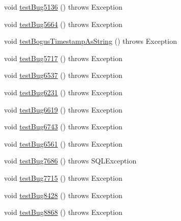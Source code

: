 \begin{DoxyCompactItemize}
\item 
void \mbox{\hyperlink{classtestsuite_1_1regression_1_1_result_set_regression_test_a9f4b082f0411dbf1f533998671d080cd}{test\+Bug5136}} ()  throws Exception 
\item 
void \mbox{\hyperlink{classtestsuite_1_1regression_1_1_result_set_regression_test_aaf08edff0fccda829794321f5eed7ca3}{test\+Bug5664}} ()  throws Exception 
\item 
void \mbox{\hyperlink{classtestsuite_1_1regression_1_1_result_set_regression_test_ad40a060d01d13a1c3718497ece0ea53b}{test\+Bogus\+Timestamp\+As\+String}} ()  throws Exception 
\item 
void \mbox{\hyperlink{classtestsuite_1_1regression_1_1_result_set_regression_test_a08e8e83e8ac874e16cd5aa89e43f6862}{test\+Bug5717}} ()  throws Exception 
\item 
void \mbox{\hyperlink{classtestsuite_1_1regression_1_1_result_set_regression_test_abe87e577ef06bd6b70aa3f685177c272}{test\+Bug6537}} ()  throws Exception 
\item 
void \mbox{\hyperlink{classtestsuite_1_1regression_1_1_result_set_regression_test_aeb09775b50784baa772c121c33812f23}{test\+Bug6231}} ()  throws Exception 
\item 
void \mbox{\hyperlink{classtestsuite_1_1regression_1_1_result_set_regression_test_a53c45e064577ff74f71310ab3a226198}{test\+Bug6619}} ()  throws Exception 
\item 
void \mbox{\hyperlink{classtestsuite_1_1regression_1_1_result_set_regression_test_a7554fa92dd3ec004371bce0ace54f245}{test\+Bug6743}} ()  throws Exception 
\item 
void \mbox{\hyperlink{classtestsuite_1_1regression_1_1_result_set_regression_test_acd7be9d4220a08025d79f53a76395993}{test\+Bug6561}} ()  throws Exception 
\item 
void \mbox{\hyperlink{classtestsuite_1_1regression_1_1_result_set_regression_test_ac63ee9e876d4d96c9d1ca956622cd2ec}{test\+Bug7686}} ()  throws S\+Q\+L\+Exception 
\item 
void \mbox{\hyperlink{classtestsuite_1_1regression_1_1_result_set_regression_test_ad13bf1855a9ea26c44b830e577097a90}{test\+Bug7715}} ()  throws Exception 
\item 
void \mbox{\hyperlink{classtestsuite_1_1regression_1_1_result_set_regression_test_a195b8d1a9669b382f6b4dc0b8866224c}{test\+Bug8428}} ()  throws Exception 
\item 
void \mbox{\hyperlink{classtestsuite_1_1regression_1_1_result_set_regression_test_a2d7ec45736b6d8ba77d988e4dae8c5a0}{test\+Bug8868}} ()  throws Exception 

\end{DoxyCompactItemize}
